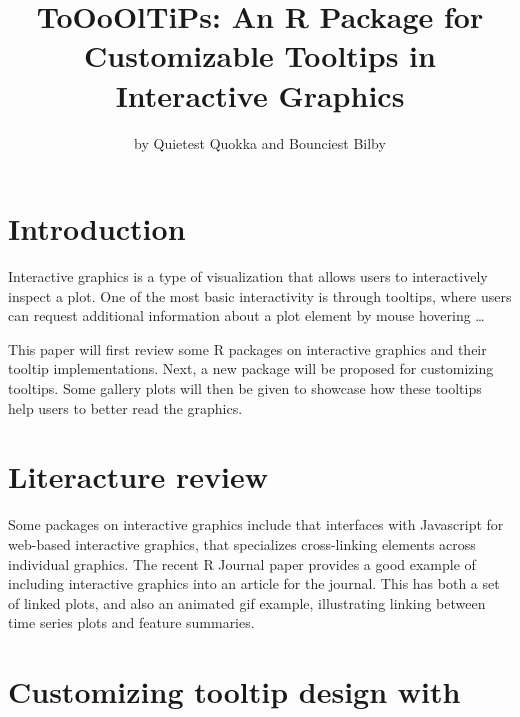 \title{ToOoOlTiPs: An R Package for Customizable Tooltips in Interactive
Graphics}
\author{by Quietest Quokka and Bounciest Bilby}

\maketitle


\hypertarget{introduction}{%
\section{Introduction}\label{introduction}}

Interactive graphics is a type of visualization that allows users to
interactively inspect a plot. One of the most basic interactivity is
through tooltips, where users can request additional information about a
plot element by mouse hovering \ldots{}

This paper will first review some R packages on interactive graphics and
their tooltip implementations. Next, a new package 
will be proposed for customizing tooltips. Some gallery plots will then
be given to showcase how these tooltips help users to better read the
graphics.

\hypertarget{literacture-review}{%
\section{Literacture review}\label{literacture-review}}

Some packages on interactive graphics include 
\citep{plotly} that interfaces with Javascript for web-based interactive
graphics,  \citep{crosstalk} that specializes
cross-linking elements across individual graphics. The recent R Journal
paper  \citep{RJ-2021-050} provides a good example
of including interactive graphics into an article for the journal. This
has both a set of linked plots, and also an animated gif example,
illustrating linking between time series plots and feature summaries.

\hypertarget{customizing-tooltip-design-with}{%
\section{\texorpdfstring{Customizing tooltip design with
}{Customizing tooltip design with }}\label{customizing-tooltip-design-with}}

